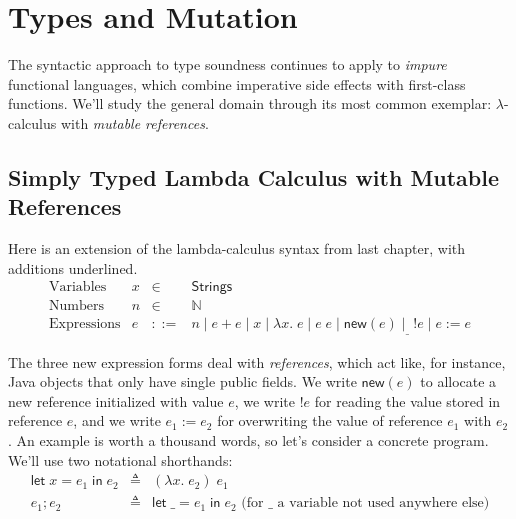\documentclass{amsbook}
\theoremstyle{definition}
\theoremstyle{remark}
\numberwithin{section}{chapter}
\numberwithin{equation}{chapter}
\begin{document}

\chapter{Types and Mutation}

The syntactic approach to type soundness continues to apply to \emph{impure} functional languages, which combine imperative side effects with first-class functions.
We'll study the general domain through its most common exemplar: $\lambda$-calculus with \emph{mutable references}.

\section{Simply Typed Lambda Calculus with Mutable References}

\newcommand{\newref}[1]{\mathsf{new}(#1)}
\newcommand{\readref}[1]{!#1}
\newcommand{\writeref}[2]{#1 := #2}

Here is an extension of the lambda-calculus syntax from last chapter, with additions underlined.
$$\begin{array}{rrcl}
  \textrm{Variables} & x &\in& \mathsf{Strings} \\
  \textrm{Numbers} & n &\in& \mathbb N \\
  \textrm{Expressions} & e &::=& n \mid e + e \mid x \mid \lambda x. \; e \mid e \; e \mid \underline{\newref{e} \mid \; \readref{e} \mid \writeref{e}{e}}
\end{array}$$

\newcommand{\elet}[3]{\mathsf{let} \; #1 = #2 \; \mathsf{in} \; #3}

The three new expression forms deal with \emph{references}, which act like, for instance, Java objects that only have single public fields.
We write $\newref{e}$ to allocate a new reference initialized with value $e$, we write $\readref{e}$ for reading the value stored in reference $e$, and we write $\writeref{e_1}{e_2}$ for overwriting the value of reference $e_1$ with $e_2$.
An example is worth a thousand words, so let's consider a concrete program.
We'll use two notational shorthands:
\begin{eqnarray*}
  \elet{x}{e_1}{e_2} &\triangleq& (\lambda x. \; e_2) \; e_1 \\
  e_1; e_2 &\triangleq& \elet{\_}{e_1}{e_2} \textrm{ (for $\_$ a variable not used anywhere else)}
\end{eqnarray*}
\end{document}
